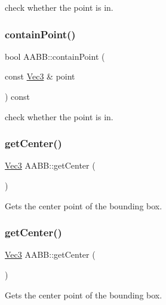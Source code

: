 check whether the point is in. \mbox{\label{classAABB_a5ff6408910dc4efafc325458a44a7835}} 
\subsubsection{\texorpdfstring{contain\+Point()}{containPoint()}\hspace{0.1cm}{\footnotesize\ttfamily [2/2]}}
{\footnotesize\ttfamily bool A\+A\+B\+B\+::contain\+Point (\begin{DoxyParamCaption}\item[{const \hyperlink{classVec3}{Vec3} \&}]{point }\end{DoxyParamCaption}) const}

check whether the point is in. \mbox{\label{classAABB_a43ae5dd7957d00b97b8d567476826762}} 
\subsubsection{\texorpdfstring{get\+Center()}{getCenter()}\hspace{0.1cm}{\footnotesize\ttfamily [1/2]}}
{\footnotesize\ttfamily \hyperlink{classVec3}{Vec3} A\+A\+B\+B\+::get\+Center (\begin{DoxyParamCaption}{ }\end{DoxyParamCaption})}

Gets the center point of the bounding box. \mbox{\label{classAABB_a43ae5dd7957d00b97b8d567476826762}} 
\subsubsection{\texorpdfstring{get\+Center()}{getCenter()}\hspace{0.1cm}{\footnotesize\ttfamily [2/2]}}
{\footnotesize\ttfamily \hyperlink{classVec3}{Vec3} A\+A\+B\+B\+::get\+Center (\begin{DoxyParamCaption}{ }\end{DoxyParamCaption})}

Gets the center point of the bounding box. \mbox{\label{classAABB_abc1e3b1f4eccf3f2e3c7683a92b8bda3}} 
